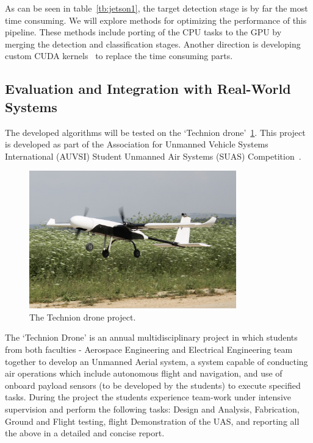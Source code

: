 \documentclass{article} %
\begin{document}
As can be seen in table~\cref{tb:jetson1}, the target detection stage is by far
the most time consuming. We will explore methods for optimizing the performance
of this pipeline. These methods include porting of the CPU tasks to the GPU by
merging the detection and classification stages. Another direction is developing
custom CUDA kernels~\cite{nvidiacuda} to replace the time consuming parts.

\subsection{Evaluation and Integration with Real-World Systems}

The developed algorithms will be tested on the `Technion
drone'~\cref{fig:drone}. This project is developed as part of the Association
for Unmanned Vehicle Systems International (AUVSI) Student Unmanned Air Systems
(SUAS) Competition~\cite{AUVSI_competition}.
\begin{figure}[h]
	\centering
	\includegraphics[width=0.8\textwidth]{drone}
	\caption{The Technion drone project.}
	\label{fig:drone}
\end{figure}
The `Technion Drone' is an annual multidisciplinary project in which students
from both faculties - Aerospace Engineering and Electrical Engineering team
together to develop an Unmanned Aerial system, a system capable of conducting
air operations which include autonomous flight and navigation, and use of
onboard payload sensors (to be developed by the students) to execute specified
tasks. During the project the students experience team-work under intensive
supervision and perform the following tasks: Design and Analysis, Fabrication,
Ground and Flight testing, flight Demonstration of the UAS, and reporting all
the above in a detailed and concise report.
\end{document}
